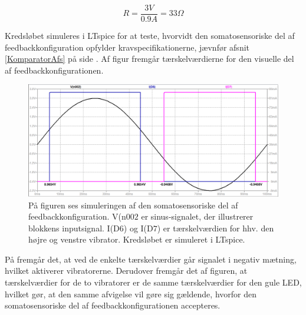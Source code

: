 \begin{equation} \label{vibrator_modstand}
R = \dfrac{3V}{0.9A} = 33\Omega
\end{equation}

\noindent Kredsløbet simuleres i LTspice for at teste, hvorvidt den somatosensoriske del af feedbackkonfiguration opfylder kravspecifikationerne, jævnfør afsnit \ref{KomparatorAfs} på side \pageref{KomparatorAfs}. Af figur  fremgår tærskelværdierne for den visuelle del af feedbackkonfigurationen.

\begin{figure}[H]
	\centering
	\includegraphics[scale=0.3]{figures/cProblemloesning/vibration_graf.PNG}
	\caption{På figuren ses simuleringen af den somatosensoriske del af feedbackkonfiguration. V(n$002$ er sinus-signalet, der illustrerer blokkens inputsignal. I(D$6$) og I(D$7$) er tærskelværdien for hhv. den højre og venstre vibrator. Kredsløbet er simuleret i LTspice.}
	\label{fig:vibration_graf}
\end{figure}
\noindent På  fremgår det, at ved de enkelte tærskelværdier går signalet i negativ mætning, hvilket aktiverer vibratorerne. Derudover fremgår det af figuren, at tærskelværdier for de to vibratorer er de samme tærskelværdier for den gule LED, hvilket gør, at den samme afvigelse vil gøre sig gældende, hvorfor den somatosensoriske del af feedbackkonfigurationen accepteres. 

